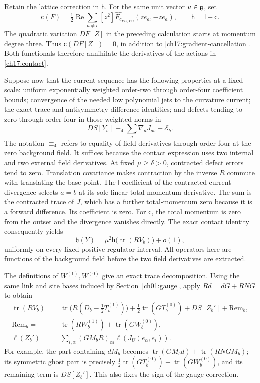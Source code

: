 Retain the lattice correction in $\mathsf h$. For the same unit vector
$u\in\mathfrak g$, set
\[
 \mathsf c(F)=\tfrac12\operatorname{Re}\sum_{a\ne c}[z^2]
 \widehat{F_c}_{cu,cu}(ze_a,-ze_a),
 \qquad \mathsf h=\mathsf l-\mathsf c.
\]
The quadratic variation $DF[Z]$ in the preceding calculation starts at
momentum degree three. Thus $\mathsf c(DF[Z])=0$, in addition to
\eqref{ch17:gradient-cancellation}. Both functionals therefore annihilate
the derivatives of the actions in \eqref{ch17:contact}.

Suppose now that the current sequence has the following
properties at a fixed scale: uniform exponentially weighted
order-two through order-four coefficient bounds; convergence of the
needed low polynomial jets to the curvature current; the exact trace
and antisymmetry difference identities; and defects tending to zero
through order four in those weighted norms in
\[
                 DS[Y_b]\equiv_4\sum_a\nabla_aJ_{ab}-\mathcal E_b.
\]
The notation $\equiv_4$ refers to equality of field derivatives through
order four at the zero background field. It suffices because the contact
expression uses two internal and two external field derivatives.
At fixed $\mu\ge\delta>0$, contracted defect errors tend to zero.
Translation covariance makes contraction by the inverse $R$ commute
with translating the base point. The $\mathsf l$ coefficient of the
contracted current divergence selects $a=b$ at its sole linear
 total-momentum derivative. The sum is the contracted trace of $J$,
which has a further total-momentum zero because it is a forward
difference. Its coefficient is zero. For $\mathsf c$, the total
momentum is zero from the outset and the divergence vanishes directly.
The exact contact identity consequently yields
\[
 \mathfrak h(Y)=\mu^2\mathsf h\bigl(\operatorname{tr}(RV_b)\bigr)+o(1),
\]
uniformly on every fixed positive regulator interval. All operators here
are functions of the background field before the two field derivatives are
extracted.

The definitions of $W^{(1)},W^{(0)}$ give an exact trace decomposition.
Using the same link and site bases induced by Section~\ref{ch01:gauge}, apply $Rd=dG+RNG$ to obtain
\begin{align*}
 \operatorname{tr}(RV_b)
  ={}&\operatorname{tr}\bigl(R(D_b-\tfrac12T_b^{(1)})\bigr)
      +\tfrac12\operatorname{tr}(GT_b^{(0)})+DS[Z_b']
      +\mathrm{Rem}_b,\\
 \mathrm{Rem}_b={}&\operatorname{tr}(RW_b^{(1)})
                                   +\operatorname{tr}(GW_b^{(0)}),\\
 \ell(Z_b')={}&\sum_{i,\alpha}(GM_bR)_{\alpha i}
                                       \ell(J_U(e_\alpha,e_i)).
\end{align*}
For example, the part containing $dM_b$ becomes
$\operatorname{tr}(GM_bd)+\operatorname{tr}(RNGM_b)$;
its symmetric ghost part is precisely
$\frac12\operatorname{tr}(GT_b^{(0)})+\operatorname{tr}(GW_b^{(0)})$,
and its remaining term is $DS[Z_b']$. This also fixes the sign of
the gauge correction.

